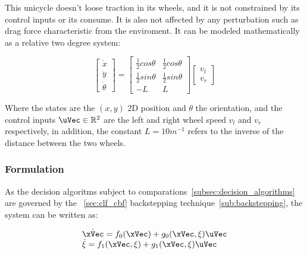 This unicycle doesn't loose traction in its wheels, and it is not constrained by its control inputs or its consume. It is also not affected by any perturbation such as drag force characteristic from the enviroment. It can be modeled mathematically as a relative two degree system:

\begin{equation}
    \begin{bmatrix} \dot{x} \\ \dot{y} \\ \dot{\theta} \end{bmatrix} = \begin{bmatrix} \frac{1}{2}cos \theta & \frac{1}{2}cos \theta \\  \frac{1}{2}sin \theta & \frac{1}{2}sin \theta \\ -L & L  \end{bmatrix} \begin{bmatrix} v_l \\ v_r\end{bmatrix}
    \label{eq:unicycle_model}
\end{equation}


Where the states are the \((x,y)\) 2D position and \(\theta\) the orientation, and the control inputs \(\uVec \in \mathbb{R}^2\) are the left and right wheel speed \(v_l\) and \(v_r\) respectively, in addition, the constant \(L = 10 m^{-1}\) refers to the inverse of the distance between the two wheels. 

\subsubsection{ Formulation}
\label{subsubsec:Unicyle_CLF-CBF_Experiment_Setup}

As the decision algoritms subject to comparations~\ref{subsec:decision_algorithms} are governed by the ~\ref{sec:clf_cbf} backstepping technique~\ref{sub:backstepping}, the system can be written as:


\begin{equation}
    \begin{array}{l}
        \dot{\xVec} = f_0(\xVec) +  g_0(\xVec, \xi)\uVec \\
        \dot{\xi} = f_1(\xVec, \xi) + g_1(\xVec, \xi)\uVec
    \end{array}
    \label{eq:second_order_unicycle_model_backstepp}
\end{equation}

